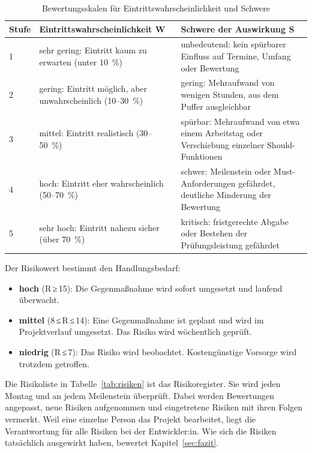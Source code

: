 \begin{table}[H]
  \caption{Bewertungsskalen für Eintrittswahrscheinlichkeit und Schwere}\label{tab:skalen}
  \begin{tabular}{@{}L{1.1cm}L{5.6cm}L{8.9cm}@{}}
    \toprule
    \textbf{Stufe} & \textbf{Eintrittswahrscheinlichkeit W} & \textbf{Schwere der Auswirkung S} \\
     & sehr gering: Eintritt kaum zu erwarten (unter 10~\%) & unbedeutend: kein spürbarer Einfluss auf Termine, Umfang oder Bewertung \\
    2 & gering: Eintritt möglich, aber unwahrscheinlich (10--30~\%) & gering: Mehraufwand von wenigen Stunden, aus dem Puffer ausgleichbar \\
    3 & mittel: Eintritt realistisch (30--50~\%) & spürbar: Mehraufwand von etwa einem Arbeitstag oder Verschiebung einzelner Should-Funktionen \\
    4 & hoch: Eintritt eher wahrscheinlich (50--70~\%) & schwer: Meilenstein oder Must-Anforderungen gefährdet, deutliche Minderung der Bewertung \\
    5 & sehr hoch: Eintritt nahezu sicher (über 70~\%) & kritisch: fristgerechte Abgabe oder Bestehen der Prüfungsleistung gefährdet \\
    \bottomrule
  \end{tabular}
\end{table}

Der Risikowert bestimmt den Handlungsbedarf:
\begin{itemize}
  \item \textbf{hoch} (R\,≥\,15): Die Gegenmaßnahme wird sofort umgesetzt und laufend überwacht.
  \item \textbf{mittel} (8\,≤\,R\,≤\,14): Eine Gegenmaßnahme ist geplant und wird im Projektverlauf umgesetzt. Das Risiko wird wöchentlich geprüft.
  \item \textbf{niedrig} (R\,≤\,7): Das Risiko wird beobachtet. Kostengünstige Vorsorge wird trotzdem getroffen.
\end{itemize}
Die Risikoliste in Tabelle~\ref{tab:risiken} ist das Risikoregister. Sie wird jeden Montag und an jedem Meilenstein überprüft. Dabei werden Bewertungen angepasst, neue Risiken aufgenommen und eingetretene Risiken mit ihren Folgen vermerkt. Weil eine einzelne Person das Projekt bearbeitet, liegt die Verantwortung für alle Risiken bei der Entwickler:in. Wie sich die Risiken tatsächlich ausgewirkt haben, bewertet Kapitel~\ref{sec:fazit}.

